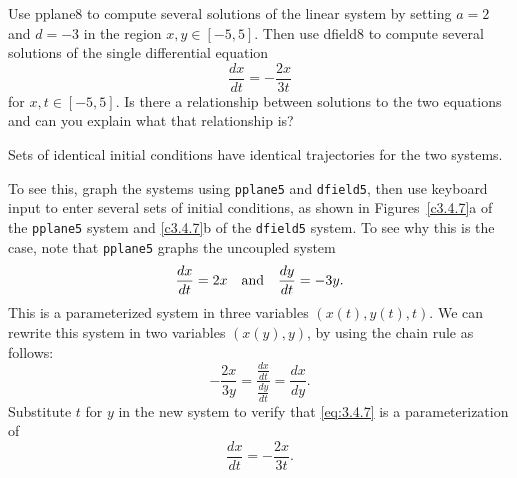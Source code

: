 \documentclass{ximera}
\begin{document}
\begin{exercise} \label{c3.4.7}
Use {\sf pplane8} to compute several solutions of the linear system by
setting $a=2$ and $d=-3$ in the region $x,y\in[-5,5]$.  Then use
{\sf dfield8} to compute several solutions of the single differential
equation
\[
\frac{dx}{dt} = -\frac{2x}{3t}
\]
for $x,t\in[-5,5]$.  Is there a relationship between solutions to the
two equations and can you explain what that relationship is?

\begin{solution}

\ans Sets of identical initial conditions have identical trajectories
for the two systems. 

\soln To see this, graph the systems using {\tt pplane5} and
{\tt dfield5}, then use keyboard input to enter several sets of initial
conditions, as shown in Figures~\ref{c3.4.7}a of the {\tt pplane5} system
and \ref{c3.4.7}b of the {\tt dfield5} system.  To see why this is the case,
note that {\tt pplane5} graphs the uncoupled system
\begin{equation} \label{eq:3.4.7}
\frac{dx}{dt} = 2x \quad\mbox{and}\quad \frac{dy}{dt} = -3y.
\end{equation}
This is a parameterized system in three variables $(x(t),y(t),t)$.
We can rewrite this system in two variables $(x(y),y)$, by using the
chain rule as follows:
\[ -\frac{2x}{3y} = \frac{\frac{dx}{dt}}{\frac{dy}{dt}} = \frac{dx}{dy}. \]
Substitute $t$ for $y$ in the new system to verify that \eqref{eq:3.4.7}
is a parameterization of
\[ \frac{dx}{dt} = -\frac{2x}{3t}. \]

\begin{figure}[htb]
			\centerline{%
			}
\end{figure}





\end{solution}
\end{exercise}
\end{document}
